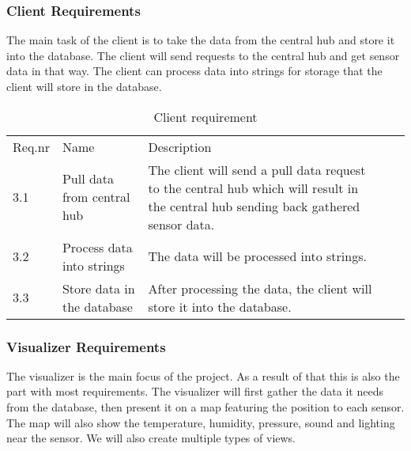 \documentclass[../document]{subfiles}
\begin{document}
\subsubsection{Client Requirements}
The main task of the client is to take the data from the central hub and store it into the database. The client will send requests to the central hub and get sensor data in that way. The client can process data into strings for storage that the client will store in the database.

\begin{table}[H]
\caption{Client requirement}
\centering
\begin{tabularx}{\textwidth}{|l|X|X|l|X|}
\hline
\\ \hline Req.nr
&Name
&Description
\\ \hline3.1
&Pull data from central hub
&The client will send a pull data request to the central hub which will result in the central hub sending back gathered sensor data.
\\ \hline3.2
&Process data into strings
&The data will be processed into strings.
\\ \hline3.3
&Store data in the database
&After processing the data, the client will store it into the database.
\\ \hline 
\end{tabularx}
\end{table}

\subsubsection{Visualizer Requirements}
The visualizer is the main focus of the project. As a result of that this is also the part with most requirements. The visualizer will first gather the data it needs from the database, then present it on a map featuring the position to each sensor. The map will also show the temperature, humidity, pressure, sound and lighting near the sensor. We will also create multiple types of views.
\end{document}
